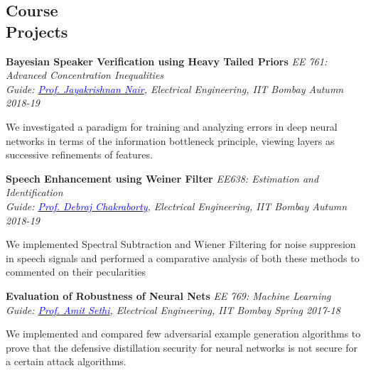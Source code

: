 \documentclass[margin,line]{res}
\newenvironment{list1}{
  \begin{list}{\ding{113}}{%
      \setlength{\itemsep}{0in}
      \setlength{\parsep}{0in} \setlength{\parskip}{0in}
      \setlength{\topsep}{0in} \setlength{\partopsep}{0in} 
      \setlength{\leftmargin}{0.17in}}}{\end{list}}
\begin{document}
\begin{resume}
\section{\sc Course \\ Projects}
{\bf Bayesian Speaker Verification using Heavy Tailed Priors} \hfill {\it EE 761: Advanced Concentration Inequalities} \\
{\em Guide: \href{https://www.ee.iitb.ac.in/~jayakrishnan.nair/}{\textcolor{blue}{Prof. Jayakrishnan Nair}}, Electrical Engineering, IIT Bombay \hfill Autumn 2018-19} \\
\vspace*{-.15in}
\begin{list1}
\item[] We investigated a paradigm for training and analyzing errors in deep neural networks in terms of the information bottleneck principle, viewing layers as successive refinements of features.
\end{list1}


{\bf Speech Enhancement using Weiner Filter} \hfill \textit{EE638: Estimation and Identification} \\
{\em Guide: \href{https://www.ee.iitb.ac.in/wiki/faculty/dc}{\textcolor{blue}{Prof. Debraj Chakraborty}}, Electrical Engineering, IIT Bombay \hfill Autumn 2018-19} \\
\vspace*{-.15in}
\begin{list1}
\item[] We implemented Spectral Subtraction and Wiener Filtering for noise suppresion in speech signals and performed a comparative analysis of both these methods to commented on their pecularities
\end{list1}

{\bf Evaluation of Robustness of Neural Nets} \hfill {\it EE 769: Machine Learning} \\
{\em Guide: \href{https://www.ee.iitb.ac.in/~asethi/}{\textcolor{blue}{Prof. Amit Sethi}}, Electrical Engineering, IIT Bombay \hfill Spring 2017-18} \\
\vspace*{-.15in}
\begin{list1}
\item[] We implemented and compared few adversarial example generation algorithms to prove that the defensive distillation security for neural networks is not secure for a certain attack algorithms.
\end{list1}


\end{resume}
\end{document}
